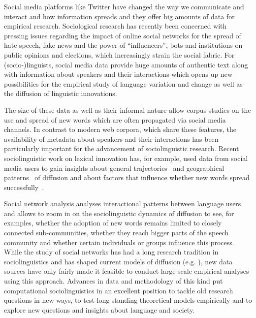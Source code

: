 \documentclass[a4paper, abstract=on]{scrartcl}
\begin{document}
  Social media platforms like Twitter have changed the way we communicate and interact and how information spreads and they offer big amounts of data for empirical research. Sociological research has recently been concerned with pressing issues regarding the impact of online social networks for the spread of hate speech, fake news and the power of \enquote{influencers}, bots and institutions on public opinions and elections, which increasingly strain the social fabric. For (socio-)linguists, social media data provide huge amounts of authentic text along with information about speakers and their interactions which opens up new possibilities for the empirical study of language variation and change as well as the diffusion of linguistic innovations.


  The size of these data as well as their informal nature allow corpus studies on the use and spread of new words which are often propagated via social media channels. In contrast to modern web corpora, which share these features, the availability of metadata about speakers and their interactions has been particularly important for the advancement of sociolinguistic research. Recent sociolinguistic work on lexical innovation has, for example, used data from social media users to gain insights about general trajectories~\parencite{Nini2017} and geographical patterns~\parencite{Eisenstein2014,Grieve2017,Grieve2018} of diffusion and about factors that influence whether new words spread successfully~\parencite{Grieveforthcoming}.

  Social network analysis analyses interactional patterns between language users and allows to zoom in on the sociolinguistic dynamics of diffusion to see, for examples, whether the adoption of new words remains limited to closely connected sub-communities, whether they reach bigger parts of the speech community and whether certain individuals or groups influence this process. While the study of social networks has had a long research tradition in sociolinguistics and has shaped current models of diffusion (e.g. \cite{Milroy1985}), new data sources have only fairly made it feasible to conduct large-scale empirical analyses using this approach. Advances in data and methodology of this kind put computational sociolinguistics in an excellent position to tackle old research questions in new ways, to test long-standing theoretical models empirically and to explore new questions and insights about language and society.
\end{document}
